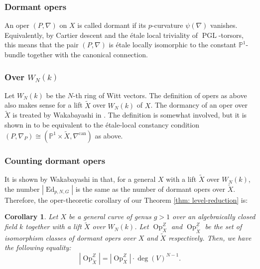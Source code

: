 \documentclass[11pt]{amsart}
\newtheorem{corollary}[theorem]{Corollary}
\newcommand{\Ed}{\operatorname{Ed}}
\begin{document}
\subsubsection*{Dormant opers}\;

An oper $(P,\nabla)$ on $X$ is called dormant if its $p$-curvature $\psi(\nabla)$ vanishes.
Equivalently, by Cartier descent and the \'etale local triviality of $\operatorname{PGL}$-torsors, this means that the pair $(P,\nabla)$ is \'etale locally isomorphic to the constant $\mathbb{P}^1$-bundle together with the canonical connection.

\subsubsection*{Over $W_N(k)$}\;

Let $W_N(k)$ be the $N$-th ring of Witt vectors.
The definition of opers as above also makes sense for a lift $\widetilde{X}$ over $W_N(k)$ of $X$.
The dormancy of an oper over $\widetilde{X}$ is treated by Wakabayashi in \cite{WakTQFT}.
The definition is somewhat involved, but it is shown in \cite[Corollary 3.12]{WakTQFT} to be equivalent to the \'etale-local constancy condition $(P,\nabla_P)\cong (\mathbb{P}^1\times \widetilde{X},\nabla^{\mathrm{can}})$ as above.

\subsubsection*{Counting dormant opers}\;

It is shown by Wakabayashi in \cite[Theorem D, Theorem E]{WakTQFT} that, for a general $X$ with a lift $\widetilde{X}$ over $W_N(k)$, the number $|\Ed_{p,N,G}|$ is the same as the number of dormant opers over $\widetilde{X}$.
Therefore, the oper-theoretic corollary of our Theorem \ref{thm: level-reduction} is:
\begin{corollary}\label{cor: counts}
    Let $X$ be a general curve of genus $g>1$ over an algebraically closed field $k$ together with a lift $\widetilde{X}$ over $W_N(k)$.
    Let $\operatorname{Op}^Z_X$ and $\operatorname{Op}_{\widetilde{X}}^Z$ be the set of isomorphism classes of dormant opers over $X$ and $\widetilde{X}$ respectively.
    Then, we have the following equality:
    \[|\operatorname{Op}_{\widetilde{X}}^Z|=|\operatorname{Op}^Z_X|\cdot \deg(V)^{N-1}.\]
\end{corollary}

\;\\
\;\\
\end{document}
